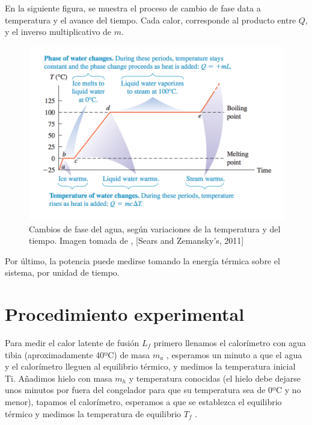 \documentclass[DIV=calc, paper=a4, fontsize=11pt, twocolumn, spanish]{scrartcl}	 %
\begin{document}
En la siguiente figura, se muestra el proceso de cambio de fase data a temperatura y el avance del tiempo. Cada calor, corresponde al producto entre $Q$, y el inverso multiplicativo de $m$.

\begin{figure}[htbp]
\centering
	\includegraphics[scale=0.5]{data/img/plot}
	\caption{Cambios de fase del agua, según variaciones de la temperatura y del tiempo. Imagen tomada de \cite{young2011sears}, [Sears and Zemansky's, 2011]}
\end{figure}

Por último, la potencia puede medirse tomando la energía térmica sobre el sistema, por unidad de tiempo.

\section*{Procedimiento experimental}

Para medir el calor latente de fusión $L_f$ primero llenamos
el calorímetro con agua tibia (aproximadamente 40ºC) de masa $m_a$ , esperamos un minuto a que el agua y el calorímetro lleguen al equilibrio térmico, y medimos la temperatura inicial Ti. Añadimos hielo con masa $m_h$ y temperatura conocidas (el hielo debe dejarse unos minutos por fuera del congelador para que su temperatura sea de 0ºC y no menor), tapamos el calorímetro, esperamos a que se establezca el equilibrio térmico y medimos la temperatura de equilibrio $T_f$ .\\
\end{document}

